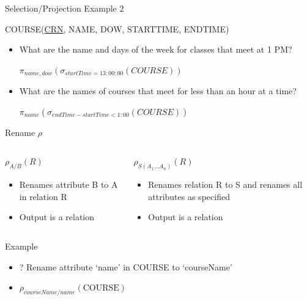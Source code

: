 \documentclass[aspectratio=169]{beamer}
\newenvironment{noindentitemize}
{ \begin{itemize}
 \setlength{\itemsep}{1.5ex}
  \setlength{\parsep}{0pt}   
  \setlength{\parskip}{0pt}
 \addtolength{\leftskip}{-2em}
 }
{ \end{itemize} }
\newcommand{\COURSE}{\textrm{COURSE}}
\begin{document}
\begin{frame}{Selection/Projection Example 2}

COURSE(\underline{CRN}, NAME, DOW, STARTTIME, ENDTIME)

\begin{noindentitemize}
\item  What are the name and days of the week for classes that meet at 1 PM?

$\pi_{name, dow}(\sigma_{startTime = 13:00:00}(COURSE))$

\item What are the names of courses that meet for less than an hour at a time?

$\pi_{name}(\sigma_{endTime - startTime < 1:00}(COURSE))$

\end{noindentitemize}
\end{frame}
\begin{frame}{Rename $\rho$}

\begin{columns}[t]
\begin{column}{0.5\textwidth}
$\rho_{A/B}(R)$
\begin{noindentitemize}
\item Renames attribute B to A in relation R
\item Output is a relation
\end{noindentitemize}

\end{column}
\begin{column}{0.5\textwidth}
$\rho_{S(A_1 \ldots A_n)}(R)$
\begin{noindentitemize}
\item Renames relation R to S and renames all attributes as specified
\item Output is a relation
\end{noindentitemize}
\end{column}
\end{columns}

\vspace{2em}
Example
\begin{noindentitemize}
\item[?] Rename attribute `name' in COURSE to `courseName'
\item $\rho_{courseName/name}(\COURSE)$
\end{noindentitemize}
\end{frame}
\end{document}

